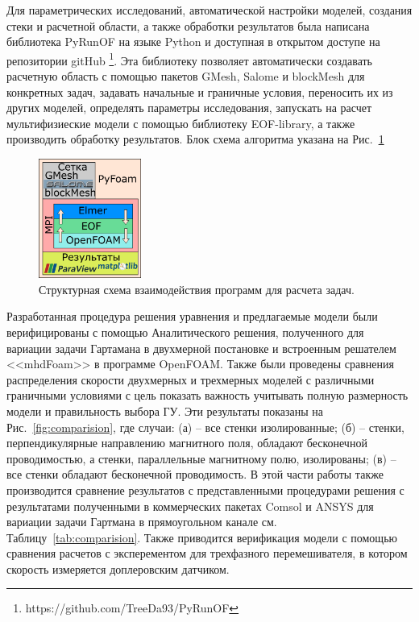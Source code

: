 Для параметрических исследований, автоматической настройки моделей, создания стеки и расчетной области, а также обработки результатов была написана библиотека PyRunOF на языке  Python и доступная в открытом доступе на репозитории gitHub \footnote{https://github.com/TreeDa93/PyRunOF}. Эта библиотеку позволяет автоматически создавать расчетную область с помощью пакетов GMesh, Salome и blockMesh для конкретных задач, задавать начальные и граничные условия, переносить их из других моделей, определять параметры исследования, запускать на расчет мультифизиеские модели с помощью библиотеку EOF-library, а также производить обработку результатов. Блок схема алгоритма указана на Рис.~\ref{fig:solver}
\begin{figure}
	\centering
	\includegraphics[width=0.3\textwidth]{Synopsis/images/part2/GeneralChartFlow_ru.png}
	\caption{Структурная схема взаимодействия программ для расчета задач.}
	\label{fig:solver}	
\end{figure}



Разработанная процедура решения уравнения и предлагаемые модели были верифицированы с помощью Аналитического решения, полученного для вариации задачи Гартамана в двухмерной постановке и встроенным решателем <<mhdFoam>> в программе OpenFOAM. Также были проведены сравнения распределения скорости двухмерных и трехмерных моделей с различными граничными условиями с цель показать важность учитывать полную размерность модели и правильность выбора ГУ. Эти результаты показаны на Рис.~\ref{fig:comparision}, где случаи: (а) -- все стенки изолированные; (б) -- стенки, перпендикулярные направлению магнитного поля, обладают бесконечной проводимостью, а стенки, параллельные магнитному полю, изолированы; (в) -- все стенки обладают бесконечной проводимость. В этой части работы также производится сравнение результатов с представленными процедурами решения с результатами полученными в коммерческих пакетах Comsol и ANSYS для вариации задачи Гартмана в прямоугольном канале см. Таблицу~\ref{tab:comparision}. Также приводится верификация модели с помощью сравнения расчетов с эксперементом для трехфазного перемешивателя, в котором скорость измеряется доплеровским датчиком. 

